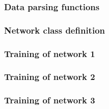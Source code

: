 \documentclass[letterpaper,headings=standardclasses]{scrartcl}
\begin{document}
\subsubsection{Data parsing functions}



\subsubsection{Network class definition}



\subsubsection{Training of network 1}



\subsubsection{Training of network 2}



\subsubsection{Training of network 3}


\end{document}
